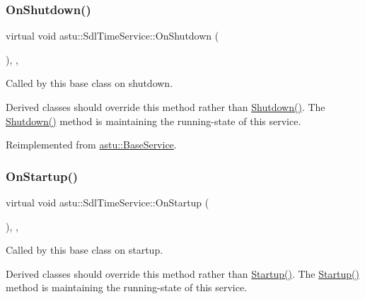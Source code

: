 \subsubsection{\texorpdfstring{On\+Shutdown()}{OnShutdown()}}
{\footnotesize\ttfamily virtual void astu\+::\+Sdl\+Time\+Service\+::\+On\+Shutdown (\begin{DoxyParamCaption}{ }\end{DoxyParamCaption})\hspace{0.3cm}{\ttfamily [override]}, {\ttfamily [protected]}, {\ttfamily [virtual]}}

Called by this base class on shutdown.

Derived classes should override this method rather than {\ttfamily \hyperlink{classastu_1_1UpdatableBaseService_a7ad7e0201007878b6014361dd5ba82f9}{Shutdown()}}. The {\ttfamily \hyperlink{classastu_1_1UpdatableBaseService_a7ad7e0201007878b6014361dd5ba82f9}{Shutdown()}} method is maintaining the running-\/state of this service. 

Reimplemented from \hyperlink{classastu_1_1BaseService_aeb5003f7c5efe5412725ac4c66942d03}{astu\+::\+Base\+Service}.

\mbox{\label{classastu_1_1SdlTimeService_ac11551691bb14289020028a2a162c7d6}} 
\subsubsection{\texorpdfstring{On\+Startup()}{OnStartup()}}
{\footnotesize\ttfamily virtual void astu\+::\+Sdl\+Time\+Service\+::\+On\+Startup (\begin{DoxyParamCaption}{ }\end{DoxyParamCaption})\hspace{0.3cm}{\ttfamily [override]}, {\ttfamily [protected]}, {\ttfamily [virtual]}}

Called by this base class on startup.

Derived classes should override this method rather than {\ttfamily \hyperlink{classastu_1_1UpdatableBaseService_a47e3725f717cee3cd8983f485b2a0243}{Startup()}}. The {\ttfamily \hyperlink{classastu_1_1UpdatableBaseService_a47e3725f717cee3cd8983f485b2a0243}{Startup()}} method is maintaining the running-\/state of this service. 


